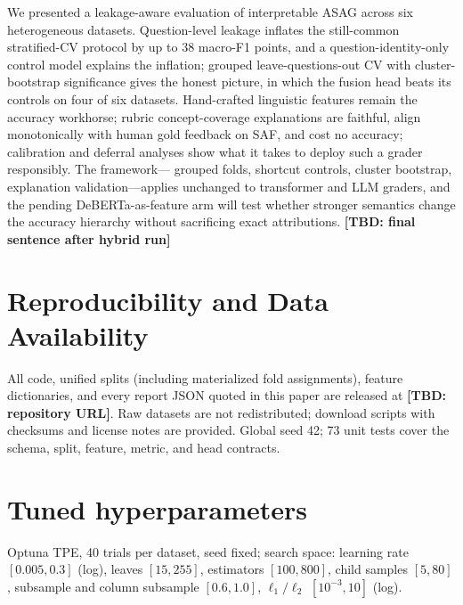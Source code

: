 \documentclass[11pt]{article}
\newcommand{\TBD}[1]{\textbf{[TBD: #1]}}
\begin{document}
We presented a leakage-aware evaluation of interpretable ASAG across six
heterogeneous datasets. Question-level leakage inflates the still-common
stratified-CV protocol by up to 38 macro-F1 points, and a
question-identity-only control model explains the inflation; grouped
leave-questions-out CV with cluster-bootstrap significance gives the honest
picture, in which the fusion head beats its controls on four of six datasets.
Hand-crafted linguistic features remain the accuracy workhorse; rubric
concept-coverage explanations are faithful, align monotonically with human
gold feedback on SAF, and cost no accuracy; calibration and deferral analyses
show what it takes to deploy such a grader responsibly. The framework---
grouped folds, shortcut controls, cluster bootstrap, explanation
validation---applies unchanged to transformer and LLM graders, and the pending
DeBERTa-as-feature arm will test whether stronger semantics change the
accuracy hierarchy without sacrificing exact attributions.
\TBD{final sentence after hybrid run}

\section*{Reproducibility and Data Availability}
All code, unified splits (including materialized fold assignments), feature
dictionaries, and every report JSON quoted in this paper are released at
\TBD{repository URL}. Raw datasets are not redistributed; download scripts
with checksums and license notes are provided. Global seed 42; 73 unit tests
cover the schema, split, feature, metric, and head contracts.




\appendix

\section{Tuned hyperparameters}
\label{app:hpo}
Optuna TPE, 40 trials per dataset, seed fixed; search space: learning rate
$[0.005, 0.3]$ (log), leaves $[15, 255]$, estimators $[100, 800]$, child
samples $[5, 80]$, subsample and column subsample $[0.6, 1.0]$,
$\ell_1/\ell_2$ $[10^{-3}, 10]$ (log).
\end{document}
